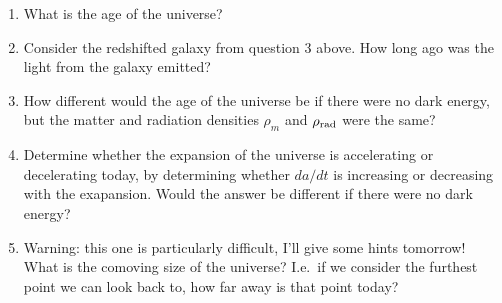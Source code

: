 \documentclass[aps,prd,superscriptaddress,groupedaddress,nofootinbib,nobibnotes]{revtex4}
\begin{document}
\begin{enumerate}[resume]
\item What is the age of the universe?
\item Consider the redshifted galaxy from question 3 above.  How long ago was the
  light from the galaxy emitted?
\item How different would the age of the universe be if there were no dark energy, but
   the matter and radiation densities $\rho_m$ and $\rho_{\rm rad}$ were the same?
\item Determine whether the expansion of the universe is accelerating or decelerating today,
  by determining whether $da/dt$ is increasing or decreasing with the exapansion.  Would
  the answer be different if there were no dark energy?
\item Warning: this one is particularly difficult, I'll give some hints tomorrow!
  What is the comoving size of the universe?  I.e.~if we consider the furthest point we
  can look back to, how far away is that point today?
\end{enumerate}


%

% 
% 

\end{document}
